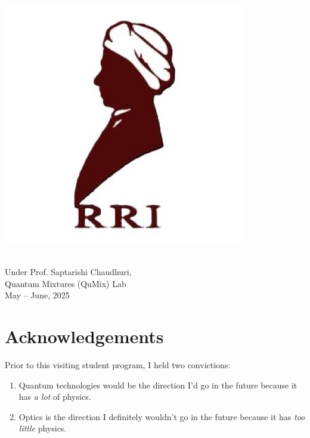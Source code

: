 \documentclass[a4paper, 12pt]{article}
\begin{document}
\begin{titlepage}
\begin{minipage}{0.45\textwidth}
        \includegraphics[width=\textwidth]{rri.jpg}
    \end{minipage}\\[1.5cm]

    {\Large Under Prof. Saptarishi Chaudhuri,}\\[0.1cm]
    {\large Quantum Mixtures (QuMix) Lab}\\[1.5cm]
    {\large May -- June, 2025}\\[0.5cm]

    \vfill
\end{titlepage}

\newpage
\tableofcontents
\newpage

\section*{Acknowledgements}
Prior to this visiting student program, I held two convictions:

\begin{enumerate}
    \item Quantum technologies would be the direction I'd go in the future because it has \textit{a lot} of physics.
    \item Optics is the direction I definitely wouldn't go in the future because it has \textit{too little} physics.
\end{enumerate}
\end{document}
